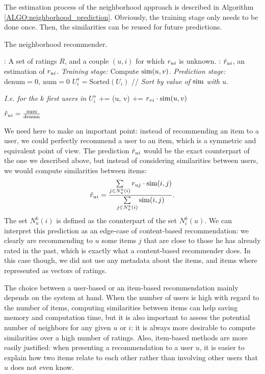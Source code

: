 The estimation process of the neighborhood approach is described in Algorithm
\ref{ALGO:neighborhood_prediction}.  Obviously, the training stage only needs
to be done once. Then, the
similarities can be reused for future predictions.

\begin{algorithm}[!ht]
 \caption{The neighborhood recommender.}
       \label{ALGO:neighborhood_prediction}
       \begin{algorithmic}

         : A set of ratings $R$, and a couple $(u, i)$ for
         which $r_{ui}$ is  unknown.
         : $\hat{r}_{ui}$, an estimation of $r_{ui}$.
         \STATE \textit{Training stage:}
         \STATE Compute $\text{sim}(u, v)$.
	    \ENDFOR
       \STATE \textit{Prediction stage:}
         \STATE $\text{denum} = 0, ~ \text{num} = 0$
         \STATE $U_i^s = \text{Sorted}(U_i)$  // \textit{Sort by value of
         $\text{sim}$ with $u$}.

         \STATE \textit{I.e. for the  $k$ first users in $U_i^s$}
         \STATE {} += \ssim(u, v)
         \STATE {} += $r_{vi} \cdot \text{sim}(u, v)$
         \ENDFOR

         \STATE $\hat{r}_{ui} = \frac{\text{num}}{\text{denum}}$
\end{algorithmic}
\end{algorithm}

We need here to make an important point: instead of recommending an item to a
user, we could perfectly recommend a user to an item, which is a symmetric and
equivalent point of view. The prediction $\hat{r}_{ui}$ would be the exact counterpart of the one we
described above, but instead of considering similarities between users, we
would compute similarities between items:
$$\hat{r}_{ui} = \frac{\sum\limits_{j \in N_u^k(i)} r_{uj} \cdot \text{sim}(i, j)}
{\sum\limits_{j \in N_u^k(i)}\text{sim}(i, j)}.$$
The set $N_u^k(i)$ is defined as the counterpart of the set $N_i^k(u)$.
We can interpret this prediction as an edge-case of content-based
recommendation: we clearly are recommending to $u$ some items $j$ that are
close to those he has already rated in the past, which is exactly what a
content-based recommender does. In this case though, we did not use any
metadata about the items, and  items where represented as vectors of ratings.

The choice between a user-based or an item-based recommendation mainly depends on
the system at hand. When the number of users is high with regard to the number
of items, computing similarities between items can help saving memory and
computation time, but it is also important to assess the potential number of
neighbors for any given $u$ or $i$: it is always more desirable to compute
similarities over a high number of ratings. Also, item-based methods are
more easily justified: when presenting a recommendation to a user $u$, it is
easier to explain how two items relate to each other rather than involving
other users that $u$ does not even know.

